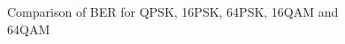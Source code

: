\begin{figure}[ht!]
    \begin{center}
        
        \caption{Comparison of BER for QPSK, 16PSK, 64PSK, 16QAM and 64QAM}
    \end{center}\label{fig:3}
\end{figure}